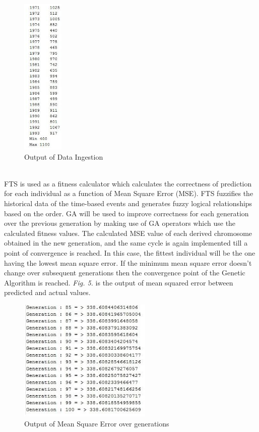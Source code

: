 \documentclass[12pt,journal,compsoc]{IEEEtran}
\begin{document}
\begin{figure}
\includegraphics[height=3in]{parseddata}
\caption{Output of Data Ingestion}
\label{parseddata}
\end{figure}
	 	 	
\\\indent FTS is used as a fitness calculator which calculates the correctness of prediction for each individual as a function of Mean Square Error (MSE). FTS fuzzifies the historical data of the time-based events and generates fuzzy logical relationships based on the order. GA will be used to improve correctness for each generation over the previous generation by making use of GA operators which use the calculated fitness values. The calculated MSE value of each derived chromosome obtained in the new generation, and the same cycle is again implemented till a point of convergence is reached. In this case, the fittest individual will be the one having the lowest mean square error. If the minimum mean square error doesn’t change over subsequent generations then the convergence point of the Genetic Algorithm is reached. \emph{Fig. 5.} is the output of mean squared error between predicted and actual values. 

\begin{figure}
\includegraphics[width=2.5in]{genop}
\caption{Output of Mean Square Error over generations}
\end{figure}
\end{document}
